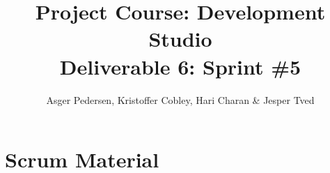 \documentclass[]{article}
\title{ Project Course: Development Studio \\ Deliverable 6: Sprint \#5}
\author{ Asger Pedersen, Kristoffer Cobley, Hari Charan \& Jesper Tved }
\begin{document}
\ifpdf
{}
\else
{}
\fi

\maketitle
\setcounter{tocdepth}{1}
\tableofcontents
\newpage





\appendix
\section{Scrum Material} %
\label{sec:Scrum Material}






\end{document}
